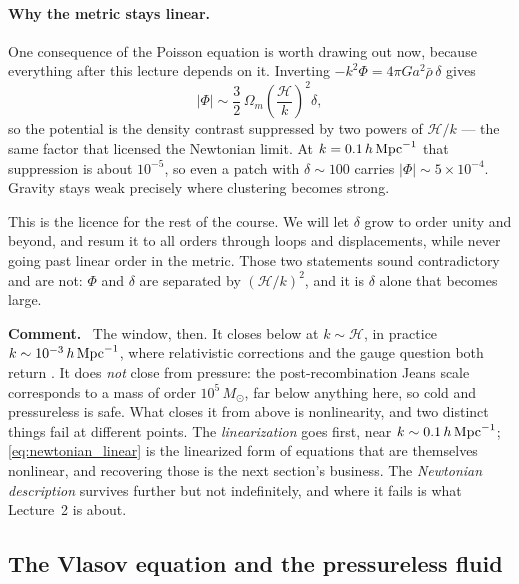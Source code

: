 \documentclass[a4paper,11pt]{article}
\def\cH{\mathcal{H}}
\def\Om{\Omega_m}
\numberwithin{equation}{section}
\newenvironment{remark}
  {\par\medskip\noindent\begingroup\small\color{ForestGreen!60!black}\textbf{Comment.}\ }
  {\endgroup\par\medskip}
\begin{document}
\paragraph{Why the metric stays linear.} One consequence of the Poisson equation
is worth drawing out now, because everything after this lecture depends on it.
Inverting $-k^2\Phi = 4\pi Ga^2\bar\rho\,\delta$ gives
\begin{equation}
|\Phi| \sim \frac{3}{2}\,\Om\left(\frac{\cH}{k}\right)^{\!2}\delta ,
\label{eq:phi_small}
\end{equation}
so the potential is the density contrast suppressed by two powers of $\cH/k$ ---
the same factor that licensed the Newtonian limit. At
$k = 0.1\,h\,{\rm Mpc}^{-1}$ that suppression is about $10^{-5}$, so even a patch
with $\delta \sim 100$ carries $|\Phi| \sim 5\times10^{-4}$. Gravity stays weak
precisely where clustering becomes strong.

This is the licence for the rest of the course. We will let $\delta$ grow to
order unity and beyond, and resum it to all orders through loops and
displacements, while never going past linear order in the metric. Those two
statements sound contradictory and are not: $\Phi$ and $\delta$ are separated by
$(\cH/k)^2$, and it is $\delta$ alone that becomes large.

\begin{remark}
The window, then. It closes below at $k\sim\cH$, in practice
$k \sim 10^{-3}\,h\,{\rm Mpc}^{-1}$, where relativistic corrections and the gauge
question both return \cite{Huterer2023}. It does \emph{not} close from pressure:
the post-recombination Jeans scale corresponds to a mass of order
$10^5\,M_\odot$, far below anything here, so cold and pressureless is safe. What
closes it from above is nonlinearity, and two distinct things fail at different
points. The \emph{linearization} goes first, near
$k\sim0.1\,h\,{\rm Mpc}^{-1}$; \eqref{eq:newtonian_linear} is the linearized form
of equations that are themselves nonlinear, and recovering those is the next
section's business. The \emph{Newtonian description} survives further but not
indefinitely, and where it fails is what Lecture~2 is about.
\end{remark}

\subsection{The Vlasov equation and the pressureless fluid}
\label{sec:vlasov}
\end{document}
